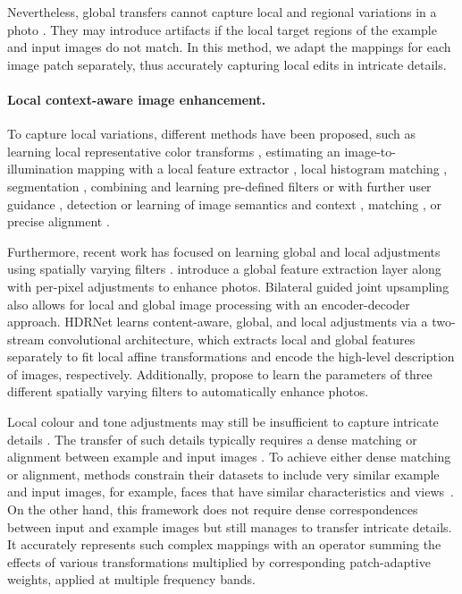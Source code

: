 Nevertheless, global transfers cannot capture local and regional variations in a photo \cite{CohenOr06Color}. They may introduce artifacts if the local target regions of the example and input images do not match. In this method, we adapt the mappings for each image patch separately, thus accurately capturing local edits in intricate details.

\paragraph{Local context-aware image enhancement.} 
To capture local variations, different methods have been proposed, such as learning local representative color transforms \cite{kim2021representative}, estimating an image-to-illumination mapping with a local feature extractor \cite{wang2019underexposed}, local histogram matching \cite{Shapira13Image}, segmentation \cite{Laffont14Transient,Tai07Soft}, combining and learning pre-defined filters \cite{Berthouzoz11AFramework,Chen18Deep,Huang14Parametric,Omiya18Learning,Saeedi18Multimodal} or with further user guidance \cite{An10User,Pouli11Progressive,Tai05Local}, detection or learning of image semantics and context \cite{Gharbi17Deep,Hwang12Context,Kaufman12Content,Nam17Deep,Yan14Automatic,Zhu18Automatic}, matching \cite{HaCohen11Nonrigid}, or precise alignment \cite{Kagarlitsky09Piecewise, Shih13Data}.

Furthermore, recent work has focused on learning global and local adjustments using spatially varying filters \cite{moran2020deeplpf, Gharbi17Deep, chen2018deep, shaham2021spatially, li2020lapar}. \citeauthor{chen2018deep} \cite{chen2018deep} introduce a global feature extraction layer along with per-pixel adjustments to enhance photos. Bilateral guided joint upsampling \cite{chen2016bilateral} also allows for local and global image processing with an encoder-decoder approach. HDRNet \cite{Gharbi17Deep} learns content-aware, global, and local adjustments via a two-stream convolutional architecture, which extracts local and global features separately to fit local affine transformations and encode the high-level description of images, respectively. Additionally, \citeauthor{moran2020deeplpf} \cite{moran2020deeplpf} propose to learn the parameters of three different spatially varying filters to automatically enhance photos.

Local colour and tone adjustments may still be insufficient to capture intricate details \cite{Bae06Two}. The transfer of such details typically requires a dense matching \cite{HaCohen11Nonrigid} or alignment between example and input images \cite{Shih14Style}. To achieve either dense matching or alignment, methods constrain their datasets to include very similar example and input images, for example, faces that have similar characteristics and views~\cite{Shih14Style}. On the other hand, this framework does not require dense correspondences between input and example images but still manages to transfer intricate details. It accurately represents such complex mappings with an operator summing the effects of various transformations multiplied by corresponding patch-adaptive weights, applied at multiple frequency bands.

